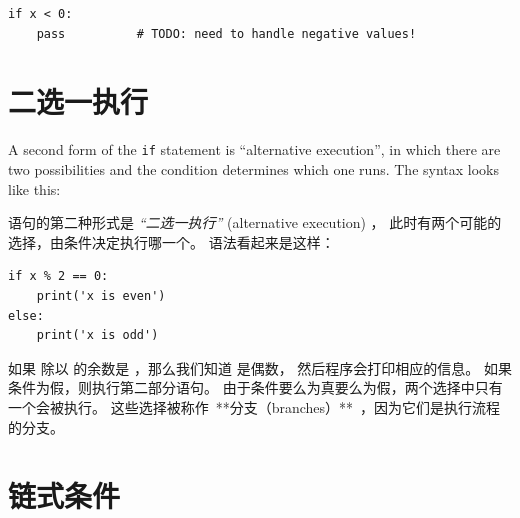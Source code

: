 {{{{\begin{lstlisting}
if x < 0:
    pass          # TODO: need to handle negative values!
\end{lstlisting}
%

\section{二选一执行}
\label{alternative.execution}
    

A second form of the {\tt if} statement is ``alternative execution'',
in which there are two possibilities and the condition determines
which one runs.  The syntax looks like this:

 语句的第二种形式是 {\em ``二选一执行''} (alternative execution) ，
此时有两个可能的选择，由条件决定执行哪一个。 语法看起来是这样：


\begin{lstlisting}
if x % 2 == 0:
    print('x is even')
else:
    print('x is odd')
\end{lstlisting}

%

如果  除以  的余数是 ，那么我们知道  是偶数，
然后程序会打印相应的信息。 如果条件为假，则执行第二部分语句。
由于条件要么为真要么为假，两个选择中只有一个会被执行。
这些选择被称作\ **分支（branches）**\ ，因为它们是执行流程的分支。

  


\section{链式条件}

}}}}

